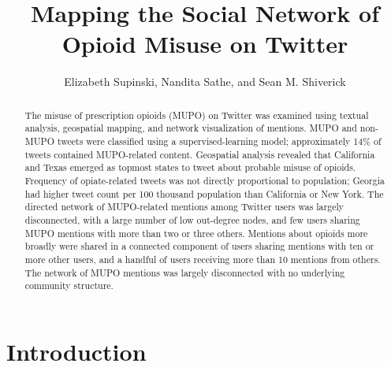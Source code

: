 \documentclass[sigconf]{acmart}
\begin{document}
\title{Mapping the Social Network of Opioid Misuse on Twitter}


\author{Elizabeth Supinski, Nandita Sathe, and Sean M. Shiverick}

\renewcommand{\shortauthors}{Supinski, Sathe, Shiverick}


\begin{abstract}
The misuse of prescription opioids (MUPO) on Twitter was examined using
textual analysis, geospatial mapping, and network visualization of mentions. 
MUPO and non-MUPO tweets were classified using a supervised-learning model; 
approximately 14\% of tweets contained MUPO-related content. Geospatial 
analysis revealed that California and Texas emerged as topmost states to tweet 
about probable misuse of opioids. Frequency of opiate-related tweets was 
not directly proportional to population; Georgia had higher tweet count per 
100 thousand population than California or New York. The directed network of 
MUPO-related mentions among Twitter users was largely disconnected, with a 
large number of low out-degree nodes, and few users sharing MUPO mentions 
with more than two or three others. Mentions about opioids more broadly were 
shared in a connected component of users sharing mentions with ten or more 
other users, and a handful of users receiving more than 10 mentions from 
others. The network of MUPO mentions was largely disconnected with no
underlying community structure. 

\end{abstract}


\maketitle


\section{Introduction}
\end{document}
